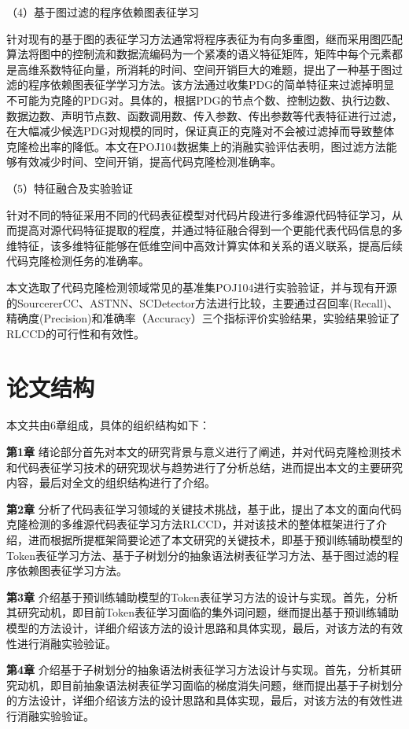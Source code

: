 （4）基于图过滤的程序依赖图表征学习

针对现有的基于图的表征学习方法通常将程序表征为有向多重图，继而采用图匹配算法将图中的控制流和数据流编码为一个紧凑的语义特征矩阵，矩阵中每个元素都是高维系数特征向量，所消耗的时间、空间开销巨大的难题，提出了一种基于图过滤的程序依赖图表征学学习方法。该方法通过收集PDG的简单特征来过滤掉明显不可能为克隆的PDG对。具体的，根据PDG的节点个数、控制边数、执行边数、数据边数、声明节点数、函数调用数、传入参数、传出参数等代表特征进行过滤，在大幅减少候选PDG对规模的同时，保证真正的克隆对不会被过滤掉而导致整体克隆检出率的降低。本文在POJ104数据集上的消融实验评估表明，图过滤方法能够有效减少时间、空间开销，提高代码克隆检测准确率。

（5）特征融合及实验验证

针对不同的特征采用不同的代码表征模型对代码片段进行多维源代码特征学习，从而提高对源代码特征提取的程度，并通过特征融合得到一个更能代表代码信息的多维特征，该多维特征能够在低维空间中高效计算实体和关系的语义联系，提高后续代码克隆检测任务的准确率。

本文选取了代码克隆检测领域常见的基准集POJ104进行实验验证，并与现有开源的SourcererCC\cite{7886988}、ASTNN\cite{8812062}、SCDetector\cite{10.1145/3324884.3416562}方法进行比较，主要通过召回率(Recall)、精确度(Precision)和准确率（Accuracy）三个指标评价实验结果，实验结果验证了RLCCD的可行性和有效性。

\section{论文结构}
本文共由6章组成，具体的组织结构如下：

\textbf{第1章} \quad 绪论部分首先对本文的研究背景与意义进行了阐述，并对代码克隆检测技术和代码表征学习技术的研究现状与趋势进行了分析总结，进而提出本文的主要研究内容，最后对全文的组织结构进行了介绍。

\textbf{第2章}  \quad 分析了代码表征学习领域的关键技术挑战，基于此，提出了本文的面向代码克隆检测的多维源代码表征学习方法RLCCD，并对该技术的整体框架进行了介绍，进而根据所提框架简要论述了本文研究的关键技术，即基于预训练辅助模型的Token表征学习方法、基于子树划分的抽象语法树表征学习方法、基于图过滤的程序依赖图表征学习方法。

\textbf{第3章}  \quad 介绍基于预训练辅助模型的Token表征学习方法的设计与实现。首先，分析其研究动机，即目前Token表征学习面临的集外词问题，继而提出基于预训练辅助模型的方法设计，详细介绍该方法的设计思路和具体实现，最后，对该方法的有效性进行消融实验验证。

\textbf{第4章}  \quad 介绍基于子树划分的抽象语法树表征学习方法设计与实现。首先，分析其研究动机，即目前抽象语法树表征学习面临的梯度消失问题，继而提出基于子树划分的方法设计，详细介绍该方法的设计思路和具体实现，最后，对该方法的有效性进行消融实验验证。


